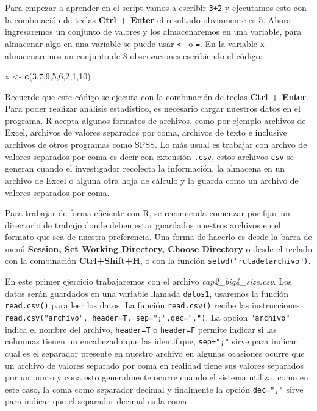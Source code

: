 \documentclass[]{book}
\newenvironment{Shaded}{\begin{snugshade}}{\end{snugshade}}
\newcommand{\KeywordTok}[1]{\textcolor[rgb]{0.13,0.29,0.53}{\textbf{#1}}}
\newcommand{\DecValTok}[1]{\textcolor[rgb]{0.00,0.00,0.81}{#1}}
\newcommand{\StringTok}[1]{\textcolor[rgb]{0.31,0.60,0.02}{#1}}
\newcommand{\NormalTok}[1]{#1}
\begin{document}
Para empezar a aprender en el script vamos a escribir \texttt{3+2} y
ejecutamos esto con la combinación de teclas \textbf{Ctrl + Enter} el
resultado obviamente es 5. Ahora ingresaremos un conjunto de valores y
los almacenaremos en una variable, para almacenar algo en una variable
se puede usar \texttt{\textless{}-} o \texttt{=}. En la variable
\texttt{x} almacenaremos un conjunto de 8 observaciones escribiendo el
código:

\begin{Shaded}
\begin{Highlighting}[]
\NormalTok{x <-}\StringTok{ }\KeywordTok{c}\NormalTok{(}\DecValTok{3}\NormalTok{,}\DecValTok{7}\NormalTok{,}\DecValTok{9}\NormalTok{,}\DecValTok{5}\NormalTok{,}\DecValTok{6}\NormalTok{,}\DecValTok{2}\NormalTok{,}\DecValTok{1}\NormalTok{,}\DecValTok{10}\NormalTok{) }
\end{Highlighting}
\end{Shaded}

Recuerde que este código se ejecuta con la combinación de teclas
\textbf{Ctrl + Enter}. Para poder realizar análisis estadístico, es
necesario cargar nuestros datos en el programa. R acepta algunos
formatos de archivos, como por ejemplo archivos de Excel, archivos de
valores separados por coma, archivos de texto e inclusive archivos de
otros programas como SPSS. Lo más usual es trabajar con archvo de
valores separados por coma es decir con extensión \texttt{.csv}, estos
archivos \texttt{csv} se generan cuando el investigador recolecta la
información, la almacena en un archivo de Excel o alguna otra hoja de
cálculo y la guarda como un archivo de valores separados por coma.

Para trabajar de forma eficiente con R, se recomienda comenzar por fijar
un directorio de trabajo donde deben estar guardados nuestros archivos
en el formato que sea de nuestra preferencia. Una forma de hacerlo es
desde la barra de menú \textbf{Session, Set Working Directory, Choose
Directory} o desde el teclado con la combinación \textbf{Ctrl+Shift+H},
o con la función \texttt{setwd("rutadelarchivo")}.

En este primer ejercicio trabajaremos con el archivo
\emph{cap2\_big4\_size.csv}. Los datos serán guardados en una variable
llamada \texttt{datos1}, usaremos la función \texttt{read.csv()} para
leer los datos. La función \texttt{read.csv()} recibe las instrucciones
\texttt{read.csv("archivo",\ header=T,\ sep=";",dec=",")}. La opción
\texttt{"archivo"} indica el nombre del archivo, \texttt{header=T} o
\texttt{header=F} permite indicar si las columnas tienen un encabezado
que las identifique, \texttt{sep=";"} sirve para indicar cual es el
separador presente en nuestro archivo en algunas ocasiones ocurre que un
archivo de valores separado por coma en realidad tiene sus valores
separados por un punto y cona esto generalmente ocurre cuando el sistema
utiliza, como en este caso, la coma como separador decimal y finalmente
la opción \texttt{dec=","} sirve para indicar que el separador decimal
es la coma.
\end{document}
